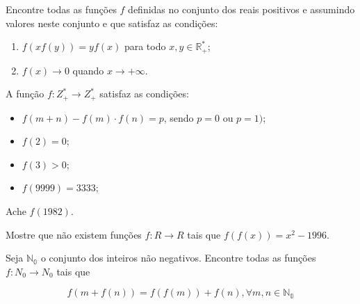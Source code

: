 \begin{questao}
  Encontre todas as funções $f$ definidas no conjunto dos reais positivos e
  assumindo valores neste conjunto e que satisfaz as condições:

  \begin{enumerate}

  \item $f(xf(y)) = yf(x)$ para todo $x,y \in \mathbb{R^*_+}$;

  \item $f(x) \rightarrow 0$ quando $x \rightarrow +\infty$.
  \end{enumerate}

\end{questao}

\begin{questao}
  A função $f: Z^{*}_{+} \rightarrow Z^{*}_{+}$ satisfaz as condições:

  \begin{itemize}[itemsep=1ex, leftmargin=1cm]

  \item $f(m+n)-f(m) \cdot f(n) = p$, sendo $p=0$ ou $p=1)$;

  \item $f(2)=0$;

  \item $f(3)>0$;

  \item $f(9999)=3333$;
  \end{itemize}

  Ache $f(1982)$.
\end{questao}

\begin{questao}
  Mostre que não existem funções $f: R \rightarrow R$ tais que $f(f(x)) =
  x^2-1996$.
\end{questao}

\begin{questao}
  Seja $\mathbb{N_0}$ o conjunto dos inteiros não negativos. Encontre todas as
  funções $f: N_0 \rightarrow N_0$ tais que

  $$f(m+f(n)) = f(f(m)) + f(n), \forall m,n \in \mathbb{N_0}$$
\end{questao}

